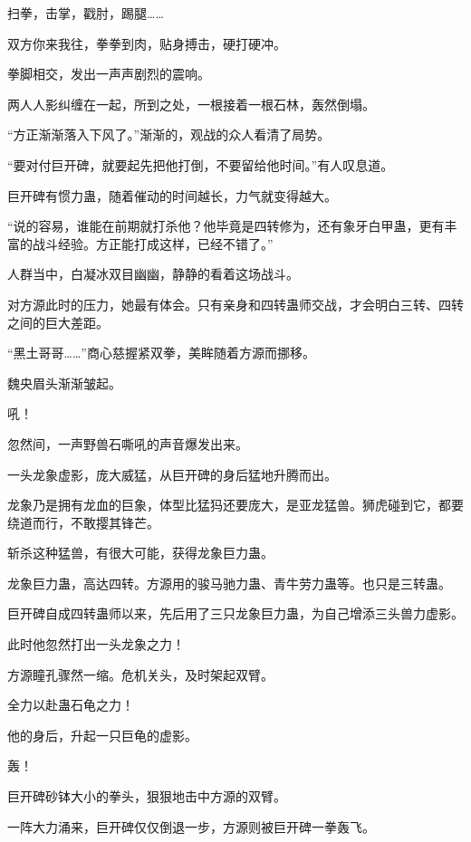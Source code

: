 
\begin{this_body}

扫拳，击掌，戳肘，踢腿……

双方你来我往，拳拳到肉，贴身搏击，硬打硬冲。

拳脚相交，发出一声声剧烈的震响。

两人人影纠缠在一起，所到之处，一根接着一根石林，轰然倒塌。

“方正渐渐落入下风了。”渐渐的，观战的众人看清了局势。

“要对付巨开碑，就要起先把他打倒，不要留给他时间。”有人叹息道。

巨开碑有惯力蛊，随着催动的时间越长，力气就变得越大。

“说的容易，谁能在前期就打杀他？他毕竟是四转修为，还有象牙白甲蛊，更有丰富的战斗经验。方正能打成这样，已经不错了。”

人群当中，白凝冰双目幽幽，静静的看着这场战斗。

对方源此时的压力，她最有体会。只有亲身和四转蛊师交战，才会明白三转、四转之间的巨大差距。

“黑土哥哥……”商心慈握紧双拳，美眸随着方源而挪移。

魏央眉头渐渐皱起。

吼！

忽然间，一声野兽石嘶吼的声音爆发出来。

一头龙象虚影，庞大威猛，从巨开碑的身后猛地升腾而出。

龙象乃是拥有龙血的巨象，体型比猛犸还要庞大，是亚龙猛兽。狮虎碰到它，都要绕道而行，不敢撄其锋芒。

斩杀这种猛兽，有很大可能，获得龙象巨力蛊。

龙象巨力蛊，高达四转。方源用的骏马驰力蛊、青牛劳力蛊等。也只是三转蛊。

巨开碑自成四转蛊师以来，先后用了三只龙象巨力蛊，为自己增添三头兽力虚影。

此时他忽然打出一头龙象之力！

方源瞳孔骤然一缩。危机关头，及时架起双臂。

全力以赴蛊石龟之力！

他的身后，升起一只巨龟的虚影。

轰！

巨开碑砂钵大小的拳头，狠狠地击中方源的双臂。

一阵大力涌来，巨开碑仅仅倒退一步，方源则被巨开碑一拳轰飞。


\end{this_body}
